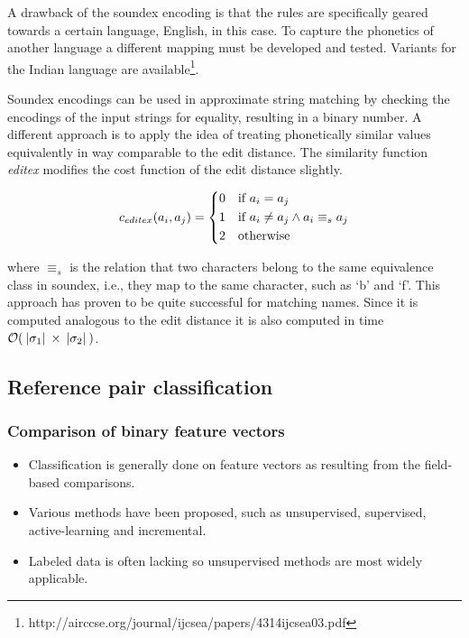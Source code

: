 A drawback of the soundex encoding is that the rules are specifically geared towards a certain language, English, in this case.
To capture the phonetics of another language a different mapping must be developed and tested.
Variants for the Indian language are available\footnote{http://airccse.org/journal/ijcsea/papers/4314ijcsea03.pdf}.

Soundex encodings can be used in approximate string matching by checking the encodings of the input strings for equality, resulting in a binary number.
A different approach is to apply the idea of treating phonetically similar values equivalently in way comparable to the edit distance.
The similarity function \emph{editex} modifies the cost function of the edit distance slightly.

\begin{equation}
    c_{editex}(a_i, a_j) =
    \begin{dcases}
        0 & \text{if } a_i = a_j \\
        1 & \text{if } a_i \neq a_j \wedge a_i \equiv_s a_j \\
        2 & \text{otherwise}
    \end{dcases}
\end{equation}

\noindent where $\equiv_s$ is the relation that two characters belong to the same equivalence class in soundex, i.e., they map to the same character, such as `b' and `f'.
This approach has proven to be quite successful for matching names\cite{zobel96}.
Since it is computed analogous to the edit distance it is also computed in time $\mathcal{O}(\:\vert {\sigma_1} \vert\: \times \:\vert {\sigma_2} \vert\:)$.




\subsection{Reference pair classification}
\label{sec:classification}




\subsubsection{Comparison of binary feature vectors}
\begin{itemize}
    \item Classification is generally done on feature vectors as resulting from the field-based comparisons.
    \item Various methods have been proposed, such as unsupervised, supervised, active-learning and incremental.
    \item Labeled data is often lacking so unsupervised methods are most widely applicable.
\end{itemize}


